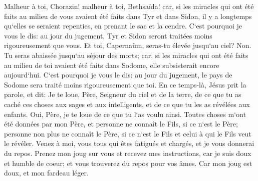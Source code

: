 \verse Malheur à toi, Chorazin! malheur à toi, Bethsaïda! car, si les miracles qui ont été faits au milieu de vous avaient été faits dans Tyr et dans Sidon, il y a longtemps qu`elles se seraient repenties, en prenant le sac et la cendre. 
\verse C`est pourquoi je vous le dis: au jour du jugement, Tyr et Sidon seront traitées moins rigoureusement que vous. 
\verse Et toi, Capernaüm, seras-tu élevée jusqu`au ciel? Non. Tu seras abaissée jusqu`au séjour des morts; car, si les miracles qui ont été faits au milieu de toi avaient été faits dans Sodome, elle subsisterait encore aujourd`hui. 
\verse C`est pourquoi je vous le dis: au jour du jugement, le pays de Sodome sera traité moins rigoureusement que toi. 
\verse En ce temps-là, Jésus prit la parole, et dit: Je te loue, Père, Seigneur du ciel et de la terre, de ce que tu as caché ces choses aux sages et aux intelligents, et de ce que tu les as révélées aux enfants. 
\verse Oui, Père, je te loue de ce que tu l`as voulu ainsi. 
\verse Toutes choses m`ont été données par mon Père, et personne ne connaît le Fils, si ce n`est le Père; personne non plus ne connaît le Père, si ce n`est le Fils et celui à qui le Fils veut le révéler. 
\verse Venez à moi, vous tous qui êtes fatigués et chargés, et je vous donnerai du repos. 
\verse Prenez mon joug sur vous et recevez mes instructions, car je suis doux et humble de coeur; et vous trouverez du repos pour vos âmes. 
\verse Car mon joug est doux, et mon fardeau léger. 

\chapter{}

